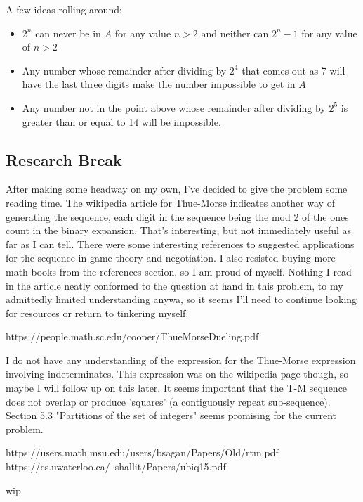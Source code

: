\documentclass{article}
\begin{document}
A few ideas rolling around:
\begin{itemize}
    \item $2^n$ can never be in $A$ for any value $n > 2$ and neither can $2^n-1$ for any value of $n > 2$
    \item Any number whose remainder after dividing by $2^4$ that comes out as 7 will have the last three digits make the number impossible to get in $A$
    \item Any number not in the point above whose remainder after dividing by $2^5$ is greater than or equal to 14 will be impossible.
\end{itemize}

\subsection*{Research Break}

After making some headway on my own, I've decided to give the problem some reading time.  The wikipedia article for Thue-Morse indicates another way of generating the sequence, each digit in the sequence being the mod 2 of the ones count in the binary expansion.  That's interesting, but not immediately useful as far as I can tell.  There were some interesting references to suggested applications for the sequence in game theory and negotiation.  I also resisted buying more math books from the references section, so I am proud of myself.  Nothing I read in the article neatly conformed to the question at hand in this problem, to my admittedly limited understanding anywa, so it seems I'll need to continue looking for resources or return to tinkering myself.

https://people.math.sc.edu/cooper/ThueMorseDueling.pdf

I do not have any understanding of the expression for the Thue-Morse expression involving indeterminates.  This expression was on the wikipedia page though, so maybe I will follow up on this later.  It seems important that the T-M sequence does not overlap or produce 'squares' (a contiguously repeat sub-sequence).  Section 5.3 "Partitions of the set of integers" seems promising for the current problem.

https://users.math.msu.edu/users/bsagan/Papers/Old/rtm.pdf
https://cs.uwaterloo.ca/~shallit/Papers/ubiq15.pdf



\par

wip
\end{document}
